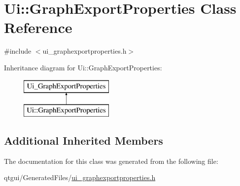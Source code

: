 \hypertarget{class_ui_1_1_graph_export_properties}{}\section{Ui\+::Graph\+Export\+Properties Class Reference}
\label{class_ui_1_1_graph_export_properties}


{\ttfamily \#include $<$ui\+\_\+graphexportproperties.\+h$>$}

Inheritance diagram for Ui\+::Graph\+Export\+Properties\+:\begin{figure}[H]
\begin{center}
\leavevmode
\includegraphics[height=2.000000cm]{d3/d56/class_ui_1_1_graph_export_properties}
\end{center}
\end{figure}
\subsection*{Additional Inherited Members}


The documentation for this class was generated from the following file\+:\begin{DoxyCompactItemize}
\item 
qtgui/\+Generated\+Files/\mbox{\hyperlink{ui__graphexportproperties_8h}{ui\+\_\+graphexportproperties.\+h}}\end{DoxyCompactItemize}
